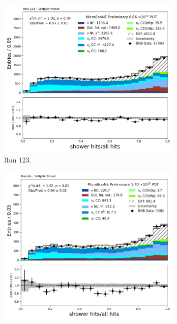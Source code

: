 \begin{figure}[H]
    \centering
    \begin{subfigure}[t]{0.32\linewidth}
        \includegraphics[width=\linewidth]{technote/Appendix_Preselection/Figures/1eNp0pi/Run123/hits_ratio_Run123_1eNp0pi_Presel.png}
        \caption{Run 123.}
    \end{subfigure}%
    \hspace{0.2cm}%
    \begin{subfigure}[t]{0.32\linewidth}
        \includegraphics[width=\linewidth]{technote/Appendix_Preselection/Figures/1eNp0pi/Run4b/hits_ratio_Run4b_1eNp0pi_Presel.png}

\end{subfigure}
\end{figure}
